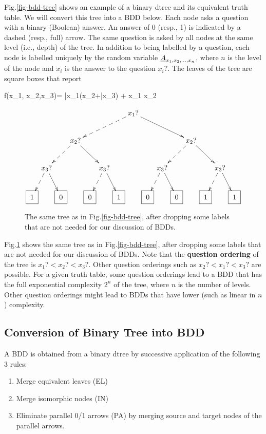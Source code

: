 Fig.\ref{fig-bdd-tree} shows an
example of a binary dtree and its 
equivalent truth table.
We will  convert this tree 
 into a BDD below. Each node asks a question with a binary (Boolean) answer. An answer of 0 (resp., 1) is indicated by a dashed (resp., full) arrow. The same question is asked by all nodes at the same level (i.e., depth) of the tree. In addition to being labelled by a question, each node is labelled uniquely by the random variable $\rvA_{x_1, x_2, \ldots, x_n}$,
where $n$ is the level of the node
and $x_i$ is the answer to the question $x_i?$.
The leaves of
the tree are square boxes that report 

\beq
f(x_1, x_2,x_3)=
\bar{x}_1(x_2+\bar{x}_3)  + x_1 x_2
\label{eq-bdd-truth-table}
\eeq
\begin{figure}[h!]
$$
\xymatrix@C=.1pc{
&&&&&&&x_1?\ar@{-->}[dllll]
\ar[drrrr]
\\
&&&x_2?\ar@{-->}[dll]\ar[drr]
&&&&&&&&x_2?\ar@{-->}[dll]\ar[drr]
\\
&x_3?\ar@{-->}[dl]\ar[dr]
&&&&x_3?\ar@{-->}[dl]\ar[dr]
&&&&x_3?\ar@{-->}[dl]\ar[dr]
&&&&x_3?\ar@{-->}[dl]\ar[dr]
\\
\Rect{1}
&&\Rect{0}
&&\Rect{0}
&&\Rect{1}
&&\Rect{0}
&&\Rect{0}
&&\Rect{1}
&&\Rect{1}
}
$$
\caption{The same tree as in Fig.\ref{fig-bdd-tree}, after dropping 
some labels that are not needed
for our discussion of BDDs.}
\label{fig-bdd-tree-simp}
\end{figure}


Fig.\ref{fig-bdd-tree-simp} shows
the same tree as in  Fig.\ref{fig-bdd-tree}, after dropping 
some labels that are not needed
for our discussion of BDDs.
Note that the {\bf question ordering} of the tree is
$x_1?<x_2?<x_3?$. Other question
orderings such as $x_2?< x_1? < x_3?$
are possible. For a given
truth table, some question 
orderings lead to a BDD 
that has the full  
exponential complexity $2^n$
of the tree, where $n$ is 
the number of levels. Other question orderings
might lead to BDDs that have lower (such as linear in $n$) 
complexity.



\subsection{Conversion of Binary Tree into BDD}

A BDD is obtained
from a binary dtree by 
successive application of the
following
3 rules:

\begin{enumerate}
\item Merge equivalent leaves (EL)
\item Merge isomorphic nodes (IN)
\item Eliminate parallel 0/1 arrows (PA) by merging source
and target nodes of the parallel  arrows.
\end{enumerate}

